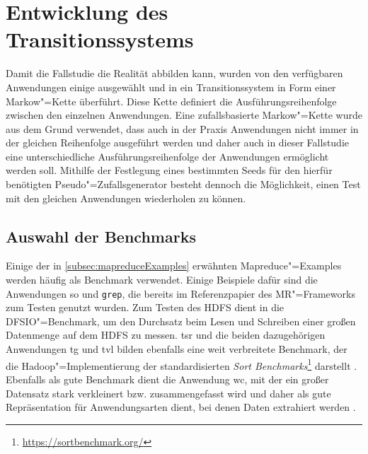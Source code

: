 \section{Entwicklung des Transitionssystems}
\label{sec:transitionsystem}

Damit die Fallstudie die Realität abbilden kann, wurden von den verfügbaren Anwendungen einige ausgewählt und in ein Transitionssystem in Form einer Markow"=Kette überführt.
Diese Kette definiert die Ausführungsreihenfolge zwischen den einzelnen Anwendungen.
Eine zufallsbasierte Markow"=Kette wurde aus dem Grund verwendet, dass auch in der Praxis Anwendungen nicht immer in der gleichen Reihenfolge ausgeführt werden und daher auch in dieser Fallstudie eine unterschiedliche Ausführungsreihenfolge der Anwendungen ermöglicht werden soll.
Mithilfe der Festlegung eines bestimmten Seeds für den hierfür benötigten Pseudo"=Zufallsgenerator besteht dennoch die Möglichkeit, einen Test mit den gleichen Anwendungen wiederholen zu können.

\subsection{Auswahl der Benchmarks}
\label{subsec:appSelection}

Einige der in \cref{subsec:mapreduceExamples} erwähnten Mapreduce"=Examples werden häufig als Benchmark verwendet.
Einige Beispiele dafür sind die Anwendungen \acrlong{so} und \texttt{grep}, die bereits im Referenzpapier \cite{Dean2004} des \gls{MR}"=Frameworks zum Testen genutzt wurden.
Zum Testen des HDFS dient in \cite{Shvachko2010} die DFSIO"=Benchmark, um den Durchsatz beim Lesen und Schreiben einer großen Datenmenge auf dem HDFS zu messen.
\acrlong{tsr} und die beiden dazugehörigen Anwendungen \acrlong{tg} und \acrlong{tvl} bilden ebenfalls eine weit verbreitete Benchmark, der die Hadoop"=Implementierung der standardisierten \emph{Sort Benchmarks}\footnote{\url{https://sortbenchmark.org/}} darstellt \cite{Graves2013}.
Ebenfalls als gute Benchmark dient die Anwendung \acrlong{wc}, mit der ein großer Datensatz stark verkleinert bzw. zusammengefasst wird und daher als gute Repräsentation für Anwendungsarten dient, bei denen Daten extrahiert werden \cite{Huang2010,Chen2012}.

